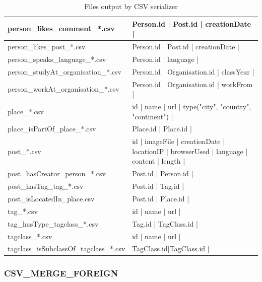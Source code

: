 \begin{landscape}
\begin{table}[t]
\begin{tabular}{|p{5cm}|p{19cm}|}
            \hline
            person\_likes\_comment\_*.csv & Person.id | Post.id | creationDate |\\
            \hline
            person\_likes\_post\_*.csv & Person.id | Post.id | creationDate |\\
            \hline
            person\_speaks\_language\_*.csv & Person.id | language |\\
            \hline
            person\_studyAt\_organisation\_*.csv & Person.id | Organisation.id | classYear |\\  
            \hline
            person\_workAt\_organisation\_*.csv &  Person.id | Organisation.id | workFrom |\\ 
            \hline
            place\_*.csv & id | name | url | type({"city", "country", "continent"}) |\\
            \hline
            place\_isPartOf\_place\_*.csv & Place.id | Place.id |\\
            \hline
            post\_*.csv & id | imageFile | creationDate | locationIP | browserUsed | language | content | length |\\
            \hline
            post\_hasCreator\_person\_*.csv & Post.id | Person.id |\\
            \hline
            post\_hasTag\_tag\_*.csv & Post.id | Tag.id |\\
            \hline
            post\_isLocatedIn\_place.csv & Post.id | Place.id |\\
            \hline
            tag\_*.csv & id | name | url | \\
            \hline
            tag\_hasType\_tagclass\_*.csv & Tag.id | TagClass.id |\\
            \hline
            tagclass\_*.csv & id | name | url | \\
            \hline
            tagclass\_isSubclassOf\_tagclass\_*.csv & TagClass.id|TagClass.id |\\
            \hline
        \end{tabular}
        \caption{Files output by CSV serializer}
        \label{table:csv}
\end{table}
\end{landscape}



\subsubsection{CSV\_MERGE\_FOREIGN}

